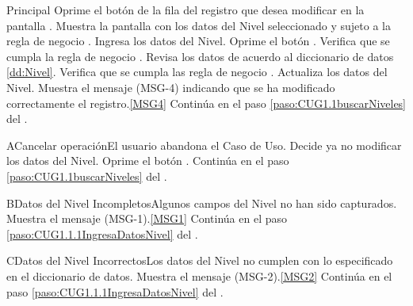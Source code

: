 	\begin{UCtrayectoria}{Principal}			
			\UCpaso[\UCactor] Oprime el botón  de la fila del registro que desea modificar en la pantalla .	
			\UCpaso Muestra la pantalla  con los datos del Nivel seleccionado y sujeto a la regla de negocio .
                        \UCpaso [\UCactor] Ingresa los datos del Nivel.\label{paso:CUG1.1.2ingresaDatosNivel}
			\UCpaso [\UCactor] Oprime el botón .
			\UCpaso Verifica que se cumpla la regla de negocio .  
			\UCpaso Revisa los datos de acuerdo al diccionario de datos \ref{dd:Nivel}. 
			\UCpaso Verifica que se cumpla las regla de negocio  .  
			\UCpaso Actualiza los datos del Nivel.
			\UCpaso Muestra el mensaje (MSG-4) indicando que se ha modificado correctamente el registro.\ref{MSG4}
			\UCpaso Continúa en el paso \ref{paso:CUG1.1buscarNiveles} del .
	\end{UCtrayectoria}

		\begin{UCtrayectoriaA}{A}{Cancelar operación}{El usuario abandona el Caso de Uso.}
			\UCpaso[\UCactor] Decide ya no modificar los datos del Nivel.
			\UCpaso[\UCactor] Oprime el botón .
			\UCpaso Continúa en el paso \ref{paso:CUG1.1buscarNiveles} del .
		\end{UCtrayectoriaA}

	\begin{UCtrayectoriaA}{B}{Datos del Nivel Incompletos}{Algunos campos del Nivel no han sido capturados.}
			\UCpaso Muestra el mensaje (MSG-1).\ref{MSG1}
			\UCpaso Continúa en el paso \ref{paso:CUG1.1.1IngresaDatosNivel} del .
	\end{UCtrayectoriaA}

	\begin{UCtrayectoriaA}{C}{Datos del Nivel Incorrectos}{Los datos del Nivel no cumplen con lo especificado en el diccionario de datos.}
			\UCpaso Muestra el mensaje (MSG-2).\ref{MSG2}
			\UCpaso Continúa en el paso \ref{paso:CUG1.1.1IngresaDatosNivel} del .
	\end{UCtrayectoriaA}

